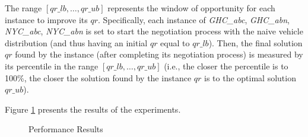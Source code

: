 The range $[qr\_lb, \ldots, qr\_ub]$ represents the window of opportunity for each instance to improve its $qr$.
Specifically, each instance
of \emph{GHC\_abc}, \emph{GHC\_abn}, \emph{NYC\_abc}, \emph{NYC\_abn}
is set to start the negotiation process with the naive vehicle distribution (and thus having an initial $qr$
equal to $qr\_lb$).
Then, the final solution $qr$ found by the instance (after completing its negotiation process) is measured by
its percentile in the range
$[qr\_lb, \ldots, qr\_ub]$ (i.e., the closer the percentile is to 100\%, the closer the solution found by the instance
$qr$ is to the optimal solution $qr\_ub$).

Figure \ref{fig:resultsFigure} presents the results of the experiments.
\begin{figure}[htbp]
    \centering
    \qquad
    \qquad
    \caption{Performance Results}
    \label{fig:resultsFigure}
\end{figure}

